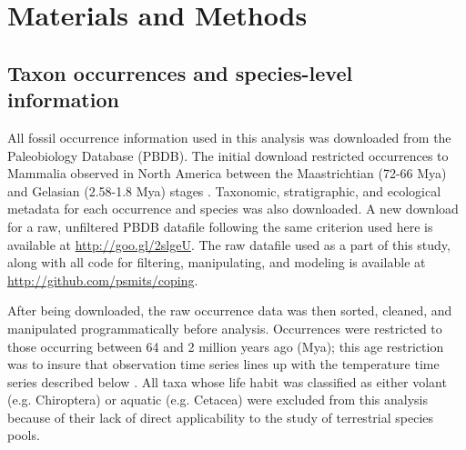 \documentclass[12pt,letterpaper]{article}
\begin{document}
\section*{Materials and Methods}

\subsection*{Taxon occurrences and species-level information}
All fossil occurrence information used in this analysis was downloaded from the Paleobiology Database (PBDB). The initial download restricted occurrences to Mammalia observed in North America between the Maastrichtian (72-66 Mya) and Gelasian (2.58-1.8 Mya) stages \citep{Cohen2015}. Taxonomic, stratigraphic, and ecological metadata for each occurrence and species was also downloaded. A new download for a raw, unfiltered PBDB datafile following the same criterion used here is available at \url{http://goo.gl/2slgeU}. The raw datafile used as a part of this study, along with all code for filtering, manipulating, and modeling is available at \url{http://github.com/psmits/coping}.

After being downloaded, the raw occurrence data was then sorted, cleaned, and manipulated programmatically before analysis. Occurrences were restricted to those occurring between 64 and 2 million years ago (Mya); this age restriction was to insure that observation time series lines up with the temperature time series described below \citep{Cramer2011}. All taxa whose life habit was classified as either volant (e.g. Chiroptera) or aquatic (e.g. Cetacea) were excluded from this analysis because of their lack of direct applicability to the study of terrestrial species pools.
\end{document}
